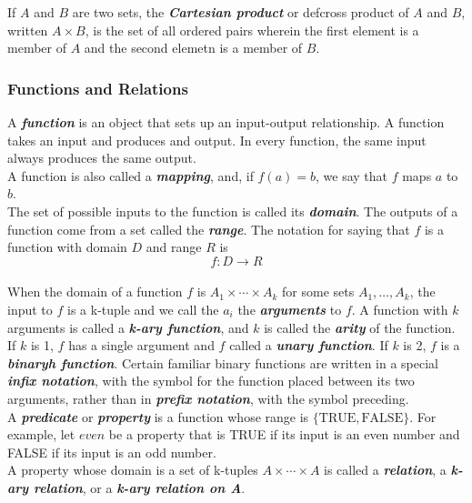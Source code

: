 \documentclass{article}
\newcommand{\define}[1]{\textbf{\textit{#1}}}
\begin{document}
If $A$ and $B$ are two sets, the \define{Cartesian product} or def{cross product} of $A$ and $B$, written $A \times B$, is the set of all ordered pairs wherein the first element is a member of $A$ and the second elemetn is a member of $B$. 

\subsubsection{Functions and Relations} 

A \define{function} is an object that sets up an input-output relationship. A function takes an input and produces and output. In every function, the same input always produces the same output. \\ 

A function is also called a \define{mapping}, and, if $f(a) = b$, we say that $f$ maps $a$ to $b$. \\ 

The set of possible inputs to the function is called its \define{domain}. The outputs of a function come from a set called the \define{range}. The notation for saying that $f$ is a function with domain $D$ and range $R$ is $$f: D \rightarrow R$$ \\ 

When the domain of a function $f$ is $A_{1} \times \cdots \times A_{k}$ for some sets $A_{1}, \dots, A_{k}$, the input to $f$ is a k-tuple and we call the $a_i$ the \define{arguments} to $f$. A function with $k$ arguments is called a \define{k-ary function}, and $k$ is called the \define{arity} of the function. If $k$ is 1, $f$ has a single argument and $f$ called a \define{unary function}. If $k$ is 2, $f$ is a \define{binaryh function}. Certain familiar binary functions are written in a special \define{infix notation}, with the symbol for the function placed between its two arguments, rather than in \define{prefix notation}, with the symbol preceding. \\ 

A \define{predicate} or \define{property} is a function whose range is $\{\textrm{TRUE}, \textrm{FALSE}\}$. For example, let $even$ be a property that is TRUE if its input is an even number and FALSE if its input is an odd number. \\ 

A property whose domain is a set of k-tuples $A \times \cdots \times A$ is called a \define{relation}, a \define{k-ary relation}, or a \define{k-ary relation on A}. \\
\end{document}
